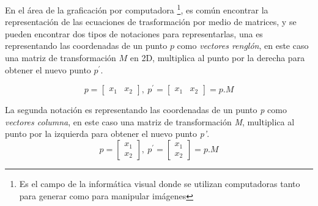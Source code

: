 En el área de la graficación por computadora \footnote{Es el campo de la informática visual donde se utilizan computadoras tanto para generar como para manipular imágenes}, es común encontrar la representación de las ecuaciones de trasformación por medio de matrices, y se pueden encontrar dos tipos de notaciones para representarlas, una es representando las coordenadas de un punto $p$ como \textit{vectores renglón}, en este caso una matriz de transformación $M$ en 2D, multiplica al punto por la derecha para obtener el nuevo punto $p^\prime$. \citep{Matias2007}

\begin{equation}
   p = \begin{bmatrix}
       x_{1} & x_{2}         
     \end{bmatrix}, \ p^{\prime} = \begin{bmatrix}
       x_{1} & x_{2}         
     \end{bmatrix}= p.M  
\end{equation} 
     
La segunda notación es representando las coordenadas de un punto \textit{p} como \textit{vectores columna}, en este caso una matriz de transformación \textit{M}, multiplica al punto por la izquierda para obtener el nuevo punto \textit{p'}.
\begin{equation}
     p = \begin{bmatrix}
       x_{1} \\ x_{2}         
     \end{bmatrix}, \ p^{\prime} = \begin{bmatrix}
       x_{1} \\ x_{2}           
     \end{bmatrix}= p.M 
\end{equation}
     
